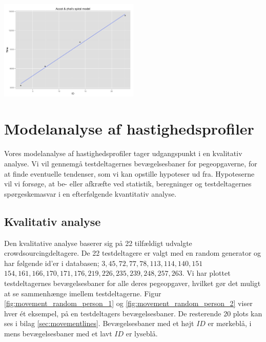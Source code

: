 \begin{minipage}{\linewidth}
	\begin{minipage}[t]{\linewidth}
		\centering
		\includegraphics[width=0.5\textwidth]{images/plots/plot_model_spiral_accot}
		\label{fig:accot_spiral_line}
	\end{minipage}
\end{minipage}

\newpage
{}
\section*{Modelanalyse af hastighedsprofiler}
Vores modelanalyse af hastighedsprofiler tager udgangspunkt i en kvalitativ analyse. Vi vil gennemgå testdeltagernes bevægelsesbaner for pegeopgaverne, for at finde eventuelle tendenser, som vi kan opstille hypoteser ud fra. Hypoteserne vil vi forsøge, at be- eller afkræfte ved statistik, beregninger og testdeltagernes spørgeskemasvar i en efterfølgende kvantitativ analyse.

\subsection*{Kvalitativ analyse}
Den kvalitative analyse baserer sig på 22 tilfældigt udvalgte crowdsourcingdeltagere. De 22 testdeltagere er valgt med en random generator og har følgende id'er i databasen; $3,45,72,77,78,113,114,140,151$ $154,161,166,170,171,176,219,226,235,239,248,257,263$. Vi har plottet testdeltagernes bevægelsesbaner for alle deres pegeopgaver, hvilket gør det muligt at se sammenhænge imellem testdeltagerne. Figur \ref{fig:movement_random_person_1} og \ref{fig:movement_random_person_2} viser hver ét eksempel, på en testdeltagers bevægelsesbaner. De resterende 20 plots kan ses i bilag \ref{sec:movementlines}. Bevægelsesbaner med et højt $ID$ er mørkeblå, i mens bevægelsesbaner med et lavt $ID$ er lyseblå.

